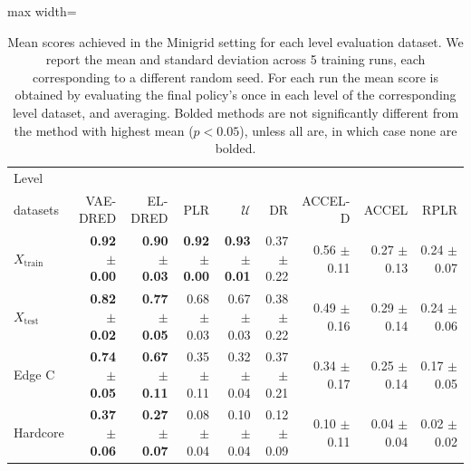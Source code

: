 \begin{table}[H]
\caption{Mean scores achieved in the Minigrid setting for each level evaluation dataset. We report the mean and standard deviation across 5 training runs, each corresponding to a different random seed. For each run the mean score is obtained by evaluating the final policy’s once in each level of the corresponding level dataset, and averaging. Bolded methods are not significantly different from the method with highest mean ($p<0.05$), unless all are, in which case none are bolded.}
\label{c3:tb:minigrid_scores}
\vskip 0.15in
\begin{center}
\begin{small}
\begin{sc}
\tabcolsep=0.11cm
\begin{adjustbox}{max width=\linewidth}
\begin{tabular}{lrrrrrrrr}
\toprule
      Level\\ datasets &                 VAE-DRED &                  EL-DRED &                      PLR &            $\mathcal{U}$ &              DR &         ACCEL-D &           ACCEL &            RPLR \\
\midrule
$X_{\mathrm{train}}$ & \textbf{0.92 $\pm$ 0.00} & \textbf{0.90 $\pm$ 0.03} & \textbf{0.92 $\pm$ 0.00} & \textbf{0.93 $\pm$ 0.01} & 0.37 $\pm$ 0.22 & 0.56 $\pm$ 0.11 & 0.27 $\pm$ 0.13 & 0.24 $\pm$ 0.07 \\
 $X_{\mathrm{test}}$ & \textbf{0.82 $\pm$ 0.02} & \textbf{0.77 $\pm$ 0.05} &          0.68 $\pm$ 0.03 &          0.67 $\pm$ 0.03 & 0.38 $\pm$ 0.22 & 0.49 $\pm$ 0.16 & 0.29 $\pm$ 0.14 & 0.24 $\pm$ 0.06 \\
              Edge C & \textbf{0.74 $\pm$ 0.05} & \textbf{0.67 $\pm$ 0.11} &          0.35 $\pm$ 0.11 &          0.32 $\pm$ 0.04 & 0.37 $\pm$ 0.21 & 0.34 $\pm$ 0.17 & 0.25 $\pm$ 0.14 & 0.17 $\pm$ 0.05 \\
            Hardcore & \textbf{0.37 $\pm$ 0.06} & \textbf{0.27 $\pm$ 0.07} &          0.08 $\pm$ 0.04 &          0.10 $\pm$ 0.04 & 0.12 $\pm$ 0.09 & 0.10 $\pm$ 0.11 & 0.04 $\pm$ 0.04 & 0.02 $\pm$ 0.02 \\
\bottomrule
\end{tabular}
\end{adjustbox}
\end{sc}
\end{small}
\end{center}
\vskip -0.1in
\end{table}

